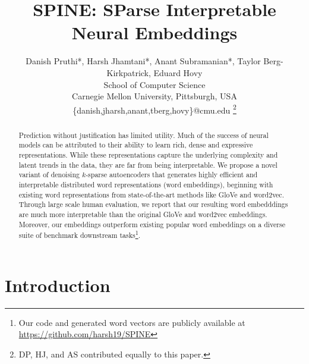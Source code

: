 \documentclass[letterpaper]{article} %
\begin{document}
%

\title{SPINE: SParse Interpretable Neural Embeddings} %

\author{
Danish Pruthi*, Harsh Jhamtani*, Anant Subramanian*, Taylor Berg-Kirkpatrick, Eduard Hovy\\ 
School of Computer Science \\
Carnegie Mellon University, Pittsburgh, USA\\
\{danish,jharsh,anant,tberg,hovy\}@cmu.edu
\thanks{DP, HJ, and AS contributed equally to this paper.}
}


\maketitle
\begin{abstract}
Prediction without justification has limited utility.
Much of the success of neural models can be attributed to their ability to learn rich, dense and expressive representations. While these representations capture the underlying complexity and latent trends in the data, they are far from being interpretable.
We propose a novel variant of denoising $k$-sparse autoencoders that generates highly efficient and interpretable distributed word representations (word embeddings), beginning with existing word representations from state-of-the-art methods like GloVe and word2vec.
Through large scale human evaluation, we report that our resulting word embedddings are much more interpretable than the original GloVe and word2vec embeddings. Moreover, our embeddings outperform existing popular word embeddings on a diverse suite of benchmark downstream tasks\footnote{Our code and generated word vectors are publicly available at \url{https://github.com/harsh19/SPINE}}.
\end{abstract}


\section{Introduction}
\end{document}
